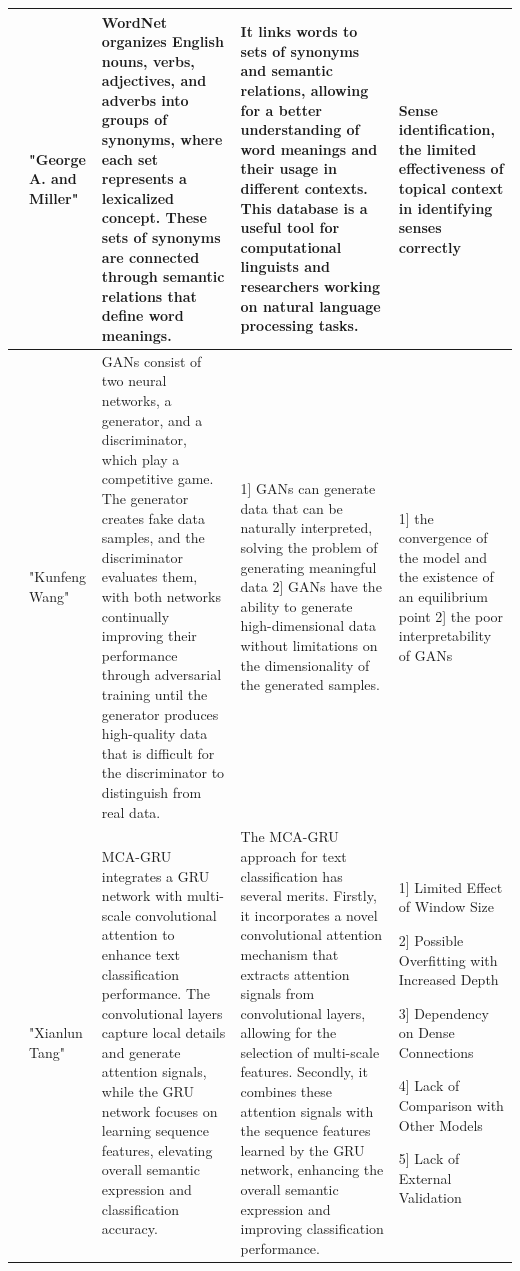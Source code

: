\documentclass[conference]{IEEEtran}
\begin{document}
\begin{table}
\begin{center}
\begin{tabular}{ |p{1cm}|p{2cm}|p{4cm}|p{4cm}|p{4cm}| }
\hline
[18]  &  "George A. and Miller" &  WordNet organizes English nouns, verbs, adjectives, and adverbs into groups of synonyms, where each set represents a lexicalized concept. These sets of synonyms are connected through semantic relations that define word meanings. & It links words to sets of synonyms and semantic relations, allowing for a better understanding of word meanings and their usage in different contexts. This database is a useful tool for computational linguists and researchers working on natural language processing tasks. &  Sense identification, 
the limited effectiveness of topical context in identifying senses correctly \\
\hline
[19]  & "Kunfeng Wang" & GANs consist of two neural networks, a generator, and a discriminator, which play a competitive game. The generator creates fake data samples, and the discriminator evaluates them, with both networks continually improving their performance through adversarial training until the generator produces high-quality data that is difficult for the discriminator to distinguish from real data. & 1]  GANs can generate data that can be naturally interpreted, solving the problem of generating meaningful data
2] GANs have the ability to generate high-dimensional data without limitations on the dimensionality of the generated samples. & 1] the convergence of the model and the existence of an equilibrium point
2] the poor interpretability of GANs
 \\
\hline
[20] &  "Xianlun Tang" & MCA-GRU integrates a GRU network with multi-scale convolutional attention to enhance text classification performance. The convolutional layers capture local details and generate attention signals, while the GRU network focuses on learning sequence features, elevating overall semantic expression and classification accuracy. &  The MCA-GRU approach for text classification has several merits. Firstly, it incorporates a novel convolutional attention mechanism that extracts attention signals from convolutional layers, allowing for the selection of multi-scale features. Secondly, it combines these attention signals with the sequence features learned by the GRU network, enhancing the overall semantic expression and improving classification performance. & 1] Limited Effect of Window Size

2] Possible Overfitting with Increased Depth

3] Dependency on Dense Connections

4] Lack of Comparison with Other Models

5] Lack of External Validation \\
\hline
\end{tabular}
\end{center}
\end{table}
\end{document}

